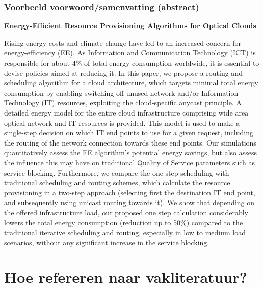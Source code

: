 \documentclass{beamer}
\begin{document}
\begin{frame}
  \frametitle{Voorbeeld voorwoord/samenvatting (abstract)}

  \begin{center}
  \end{center}

  \scriptsize
  \textbf{Energy-Efficient Resource Provisioning Algorithms for Optical Clouds}

  \alert<1>{Rising energy costs and climate change have led to an increased concern for energy-efficiency (EE). As Information and Communication Technology (ICT) is responsible for about 4\% of total energy consumption worldwide, it is essential to devise policies aimed at reducing it.} \alert<2>{In this paper, we propose a routing and scheduling algorithm for a cloud architecture, which targets minimal total energy consumption by enabling switching off unused network and/or Information Technology (IT) resources, exploiting the cloud-specific anycast principle.} \alert<3>{A detailed energy model for the entire cloud infrastructure comprising wide area optical network and IT resources is provided. This model is used to make a single-step decision on which IT end points to use for a given request, including the routing of the network connection towards these end points. Our simulations quantitatively assess the EE algorithm’s potential energy savings, but also assess the influence this may have on traditional Quality of Service parameters such as service blocking. Furthermore, we compare the one-step scheduling with traditional scheduling and routing schemes, which calculate the resource provisioning in a two-step approach (selecting first the destination IT end point, and subsequently using unicast routing towards it).} \alert<4>{We show that depending on the offered infrastructure load, our proposed one step calculation considerably lowers the total energy consumption (reduction up to 50\%) compared to the traditional iterative scheduling and routing, especially in low to medium load scenarios, without any significant increase in the service blocking.}

\end{frame}



\section{Hoe refereren naar vakliteratuur?}
\end{document}
